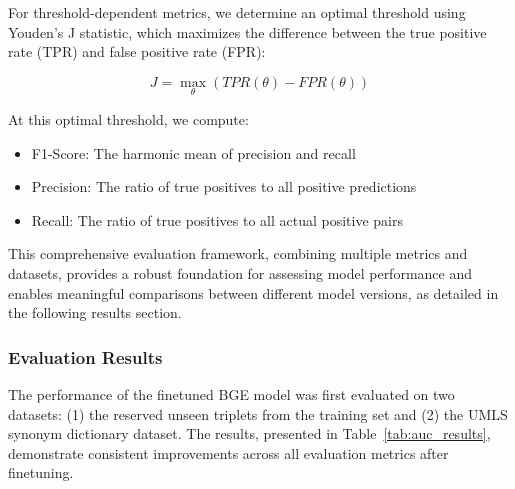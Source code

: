 For threshold-dependent metrics, we determine an optimal threshold using Youden's J statistic, which maximizes the difference between the true positive rate (TPR) and false positive rate (FPR):

\begin{equation}
J = \max_{\theta}(TPR(\theta) - FPR(\theta))
\end{equation}

At this optimal threshold, we compute:
\begin{itemize}
    \item F1-Score: The harmonic mean of precision and recall
    \item Precision: The ratio of true positives to all positive predictions
    \item Recall: The ratio of true positives to all actual positive pairs
\end{itemize}

This comprehensive evaluation framework, combining multiple metrics and datasets, provides a robust foundation for assessing model performance and enables meaningful comparisons between different model versions, as detailed in the following results section.

\subsubsection{Evaluation Results}
\label{subsubsec:evaluation_results}

The performance of the finetuned BGE model was first evaluated on two datasets: (1) the reserved unseen triplets from the training set and (2) the UMLS synonym dictionary dataset. The results, presented in Table~\ref{tab:auc_results}, demonstrate consistent improvements across all evaluation metrics after finetuning.

